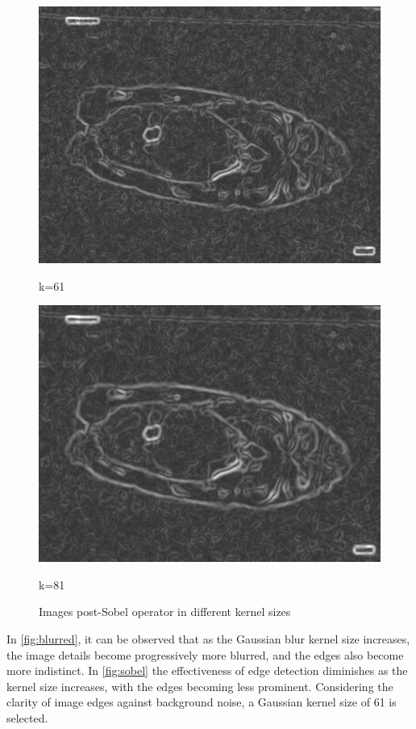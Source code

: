 \begin{figure}
\begin{minipage}{0.24\textwidth}
        \includegraphics[width=\textwidth]{./fig/gausssian/sobel61.jpg}
        \caption*{k=61}
    \end{minipage}
    \begin{minipage}{0.24\textwidth}
        \centering
        \includegraphics[width=\textwidth]{./fig/gausssian/sobel81.jpg}
        \caption*{k=81}
    \end{minipage}
    \caption{Images post-Sobel operator in different kernel sizes}
    \label{fig:sobel}
\end{figure}

In \autoref{fig:blurred}, it can be observed that as the Gaussian blur kernel size increases, the image details become progressively more blurred, and the edges also become more indistinct. In \autoref{fig:sobel} the effectiveness of edge detection diminishes as the kernel size increases, with the edges becoming less prominent. Considering the clarity of image edges against background noise, a Gaussian kernel size of 61 is selected.


